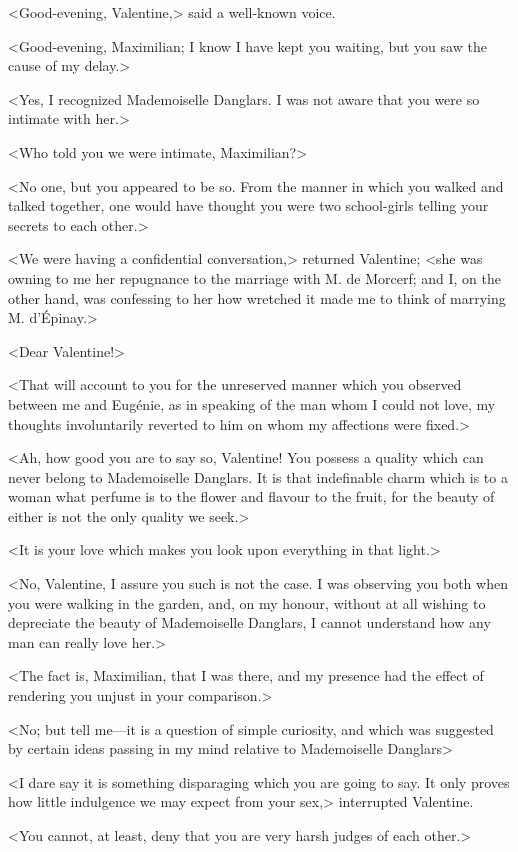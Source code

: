  <Good-evening, Valentine,> said a well-known voice. 

 <Good-evening, Maximilian; I know I have kept you waiting, but you saw the cause of my delay.> 

 <Yes, I recognized Mademoiselle Danglars. I was not aware that you were so intimate with her.> 

 <Who told you we were intimate, Maximilian?> 

 <No one, but you appeared to be so. From the manner in which you walked and talked together, one would have thought you were two school-girls telling your secrets to each other.> 

 <We were having a confidential conversation,> returned Valentine; <she was owning to me her repugnance to the marriage with M. de Morcerf; and I, on the other hand, was confessing to her how wretched it made me to think of marrying M. d'Épinay.> 

 <Dear Valentine!> 

 <That will account to you for the unreserved manner which you observed between me and Eugénie, as in speaking of the man whom I could not love, my thoughts involuntarily reverted to him on whom my affections were fixed.> 

 <Ah, how good you are to say so, Valentine! You possess a quality which can never belong to Mademoiselle Danglars. It is that indefinable charm which is to a woman what perfume is to the flower and flavour to the fruit, for the beauty of either is not the only quality we seek.> 

 <It is your love which makes you look upon everything in that light.> 

 <No, Valentine, I assure you such is not the case. I was observing you both when you were walking in the garden, and, on my honour, without at all wishing to depreciate the beauty of Mademoiselle Danglars, I cannot understand how any man can really love her.> 

 <The fact is, Maximilian, that I was there, and my presence had the effect of rendering you unjust in your comparison.> 

 <No; but tell me—it is a question of simple curiosity, and which was suggested by certain ideas passing in my mind relative to Mademoiselle Danglars\longdash> 

 <I dare say it is something disparaging which you are going to say. It only proves how little indulgence we may expect from your sex,> interrupted Valentine. 

 <You cannot, at least, deny that you are very harsh judges of each other.> 

